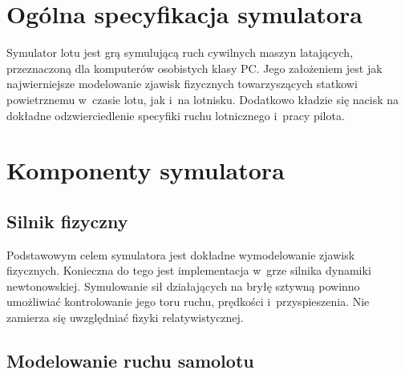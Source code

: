 \documentclass{mwrep}
\begin{document}
\section{Ogólna specyfikacja symulatora}

Symulator lotu jest grą symulującą ruch cywilnych maszyn latających, przeznaczoną dla komputerów osobistych klasy PC. Jego założeniem jest jak najwierniejsze modelowanie zjawisk fizycznych towarzyszących statkowi powietrznemu w~czasie lotu, jak i~na lotnisku. Dodatkowo kładzie się nacisk na dokładne odzwierciedlenie specyfiki ruchu lotnicznego i~pracy pilota.

\section{Komponenty symulatora}

\subsection{Silnik fizyczny}

Podstawowym celem symulatora jest dokładne wymodelowanie zjawisk fizycznych. Konieczna do tego jest implementacja w~grze silnika dynamiki newtonowskiej. Symulowanie sił działających na bryłę sztywną powinno umożliwiać kontrolowanie jego toru ruchu, prędkości i~przyspieszenia. Nie zamierza się uwzględniać fizyki relatywistycznej.

\subsection{Modelowanie ruchu samolotu}
\end{document}
